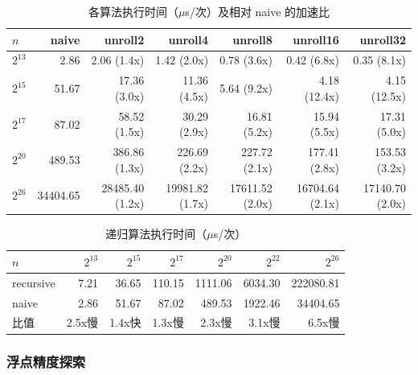 \documentclass[a4paper]{article}
\begin{document}
\begin{table}[!ht]
\centering
\caption{各算法执行时间（$\mu$s/次）及相对 naive 的加速比}
\label{table:exp2_time}
\begin{tabular}{@{}lrrrrrr@{}}
\toprule
$n$ & naive & unroll2 & unroll4 & unroll8 & unroll16 & unroll32 \\
\midrule
$2^{13}$ &  2.86 &  2.06 (1.4x) &  1.42 (2.0x) &  0.78 (3.6x) &  0.42 (6.8x) &  0.35 (8.1x) \\
$2^{15}$ & 51.67 & 17.36 (3.0x) & 11.36 (4.5x) &  5.64 (9.2x) &  4.18 (12.4x) & 4.15 (12.5x) \\
$2^{17}$ & 87.02 & 58.52 (1.5x) & 30.29 (2.9x) & 16.81 (5.2x) & 15.94 (5.5x) & 17.31 (5.0x) \\
$2^{20}$ & 489.53 & 386.86 (1.3x) & 226.69 (2.2x) & 227.72 (2.1x) & 177.41 (2.8x) & 153.53 (3.2x) \\
$2^{26}$ & 34404.65 & 28485.40 (1.2x) & 19981.82 (1.7x) & 17611.52 (2.0x) & 16704.64 (2.1x) & 17140.70 (2.0x) \\
\bottomrule
\end{tabular}
\end{table}

\begin{table}[!ht]
\centering
\caption{递归算法执行时间（$\mu$s/次）}
\label{table:exp2_recursive}
\begin{tabular}{@{}lrrrrrr@{}}
\toprule
$n$ & $2^{13}$ & $2^{15}$ & $2^{17}$ & $2^{20}$ & $2^{22}$ & $2^{26}$ \\
\midrule
recursive & 7.21 & 36.65 & 110.15 & 1111.06 & 6034.30 & 222080.81 \\
naive      & 2.86 & 51.67 &  87.02 &  489.53 & 1922.46 &  34404.65 \\
比值       & 2.5x慢 & 1.4x快 & 1.3x慢 & 2.3x慢 & 3.1x慢 & 6.5x慢 \\
\bottomrule
\end{tabular}
\end{table}

\subsubsection{浮点精度探索}
\end{document}

